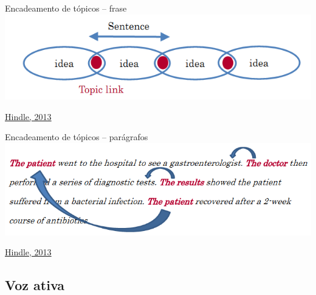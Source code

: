 \documentclass{beamer}
\begin{document}
\begin{frame}{Encadeamento de tópicos -- frase}
  \includegraphics[width=\textwidth]{Escrita/encadeamento1}

  \vfill
  \scriptsize
  \hfill \href{https://web.archive.org/web/20150512123007/http://www.edanzediting.com/blog/reader_expectations_topic_position}
  {Hindle, 2013}
\end{frame}

\begin{frame}{Encadeamento de tópicos -- parágrafos}
    \includegraphics[width=\textwidth]{Escrita/encadeamento2}

  \vfill
  \scriptsize
  \hfill \href{https://web.archive.org/web/20150512123007/http://www.edanzediting.com/blog/reader_expectations_topic_position}
  {Hindle, 2013}
\end{frame}

\subsection{Voz ativa}
\end{document}
